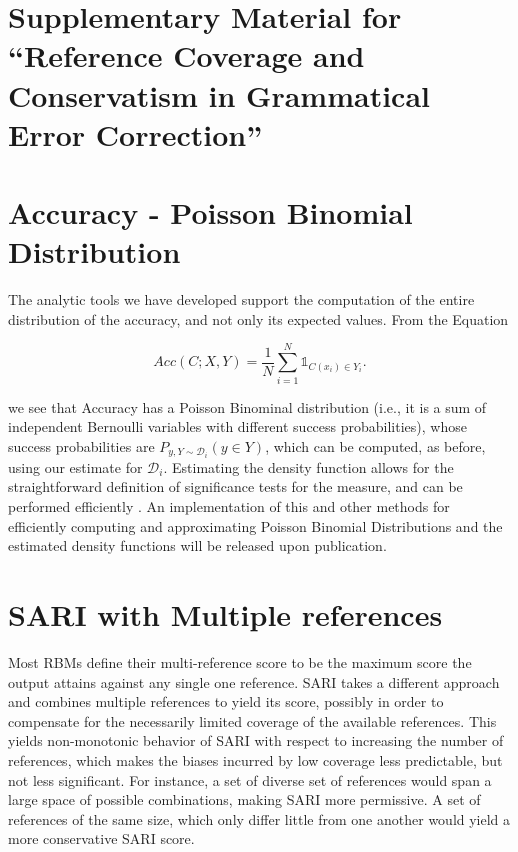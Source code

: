 \documentclass[letterpaper, 11pt]{article}
\newenvironment{myequation}{
  \vspace{-1em}
 \begin{equation}
}{
 \end{equation}
 \vspace{-1.2em}
}
\begin{document}
\appendix

\title{}

\onecolumn
\section*{\Large Supplementary Material for ``Reference Coverage and Conservatism in Grammatical Error Correction''}
\section{Accuracy - Poisson Binomial Distribution}\label{ap:poibin}
The analytic tools we have developed support the computation of the entire distribution of the accuracy, and not only its expected values. From the Equation 
	
	\begin{myequation}\label{eq:acc_def}
		Acc\left(C;X,Y\right) = \frac{1}{N} \sum_{i=1}^N \mathds{1}_{C(x_i) \in Y_i}.
	\end{myequation}
	
\noindent
 we see that Accuracy has a Poisson Binominal distribution (i.e., it is a sum of independent Bernoulli variables with different success probabilities), whose success probabilities are $P_{y,Y \sim \mathcal{D}_i}(y \in Y)$, which can be computed, as before, using our estimate for $\mathcal{D}_i$. Estimating the density function allows for the straightforward definition of significance tests for the measure, and can be performed efficiently \cite{hong2013computing}. An implementation of this and other methods for efficiently computing and approximating Poisson Binomial Distributions and the estimated density functions will be released upon publication.

\section{SARI with Multiple references}\label{ap:sari-assum}
Most RBMs define their multi-reference score to be the maximum score the
output attains against any single one reference.
SARI takes a different approach and combines multiple references to yield its score, 
possibly in order to compensate for the necessarily limited coverage of the available
references. This yields non-monotonic behavior of SARI with respect to increasing
the number of references, which makes the biases incurred by low coverage less predictable,
but not less significant.
For instance, a set of diverse set of references would span a large space of possible
combinations, making SARI more permissive. A set of references of the same size, which only differ little
from one another would yield a more conservative SARI score.
\end{document}
